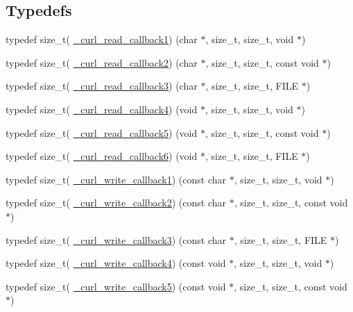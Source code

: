\subsection*{Typedefs}
\begin{DoxyCompactItemize}
\item 
typedef size\+\_\+t( \hyperlink{typecheck-gcc_8h_aa598cc71fb379db1bc23ff76e8b875c1}{\+\_\+curl\+\_\+read\+\_\+callback1}) (char $\ast$, size\+\_\+t, size\+\_\+t, void $\ast$)
\item 
typedef size\+\_\+t( \hyperlink{typecheck-gcc_8h_abc8917aae6499414b1ed0d570d8a9b72}{\+\_\+curl\+\_\+read\+\_\+callback2}) (char $\ast$, size\+\_\+t, size\+\_\+t, const void $\ast$)
\item 
typedef size\+\_\+t( \hyperlink{typecheck-gcc_8h_a9202adcd389876f4145aec8acd84387e}{\+\_\+curl\+\_\+read\+\_\+callback3}) (char $\ast$, size\+\_\+t, size\+\_\+t, F\+I\+L\+E $\ast$)
\item 
typedef size\+\_\+t( \hyperlink{typecheck-gcc_8h_acb4f6e1103153bc123153dc508530645}{\+\_\+curl\+\_\+read\+\_\+callback4}) (void $\ast$, size\+\_\+t, size\+\_\+t, void $\ast$)
\item 
typedef size\+\_\+t( \hyperlink{typecheck-gcc_8h_acb2e70bfa62e3fad2801c74ad83ae43c}{\+\_\+curl\+\_\+read\+\_\+callback5}) (void $\ast$, size\+\_\+t, size\+\_\+t, const void $\ast$)
\item 
typedef size\+\_\+t( \hyperlink{typecheck-gcc_8h_a7cac2f82ccf5a3dcb04f60d865119cce}{\+\_\+curl\+\_\+read\+\_\+callback6}) (void $\ast$, size\+\_\+t, size\+\_\+t, F\+I\+L\+E $\ast$)
\item 
typedef size\+\_\+t( \hyperlink{typecheck-gcc_8h_a6e919be022ec3a171fe5a52105753ba3}{\+\_\+curl\+\_\+write\+\_\+callback1}) (const char $\ast$, size\+\_\+t, size\+\_\+t, void $\ast$)
\item 
typedef size\+\_\+t( \hyperlink{typecheck-gcc_8h_aad4fdd999d08cae171a468c1e97d55d4}{\+\_\+curl\+\_\+write\+\_\+callback2}) (const char $\ast$, size\+\_\+t, size\+\_\+t, const void $\ast$)
\item 
typedef size\+\_\+t( \hyperlink{typecheck-gcc_8h_a94115d6760e3f7d4815177ca51903dce}{\+\_\+curl\+\_\+write\+\_\+callback3}) (const char $\ast$, size\+\_\+t, size\+\_\+t, F\+I\+L\+E $\ast$)
\item 
typedef size\+\_\+t( \hyperlink{typecheck-gcc_8h_a8c3b7fedfa10f92d318198423336183d}{\+\_\+curl\+\_\+write\+\_\+callback4}) (const void $\ast$, size\+\_\+t, size\+\_\+t, void $\ast$)
\item 
typedef size\+\_\+t( \hyperlink{typecheck-gcc_8h_adbc7b265ad924bbb086fe32e0b52935f}{\+\_\+curl\+\_\+write\+\_\+callback5}) (const void $\ast$, size\+\_\+t, size\+\_\+t, const void $\ast$)

\end{DoxyCompactItemize}
